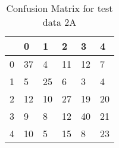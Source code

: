 \begin{table}[H]
\centering
\begin{tabular}{|l|l|l|l|l|l|}
\hline
&  0 & 1 & 2 & 3 & 4 \\
\hline
0 & 37 & 4 & 11 & 12 & 7 \\
\hline
1 & 5 & 25 & 6 & 3 & 4 \\
\hline
2 & 12 & 10 & 27 & 19 & 20 \\
\hline
3 & 9 & 8 & 12 & 40 & 21 \\
\hline
4 & 10 & 5 & 15 & 8 & 23 \\
\hline
\end{tabular}
\caption{Confusion Matrix for test data 2A}
\label{tab:conf_test2a}
\end{table}

